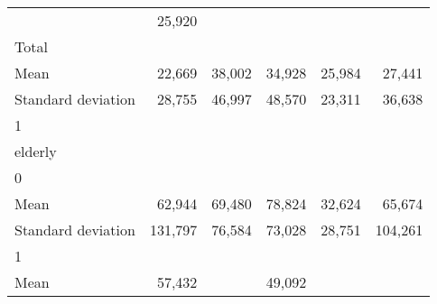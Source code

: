 \begin{tabular}{llllll}
  \multicolumn{1}{r}{} &
  \multicolumn{1}{r}{25,920} \\
\multicolumn{1}{l}{\hspace{3em}Total} &
  \multicolumn{1}{|r}{} &
  \multicolumn{1}{r}{} &
  \multicolumn{1}{r}{} &
  \multicolumn{1}{r}{} &
  \multicolumn{1}{r}{} \\
\multicolumn{1}{l}{\hspace{4em}Mean} &
  \multicolumn{1}{|r}{22,669} &
  \multicolumn{1}{r}{38,002} &
  \multicolumn{1}{r}{34,928} &
  \multicolumn{1}{r}{25,984} &
  \multicolumn{1}{r}{27,441} \\
\multicolumn{1}{l}{\hspace{4em}Standard deviation} &
  \multicolumn{1}{|r}{28,755} &
  \multicolumn{1}{r}{46,997} &
  \multicolumn{1}{r}{48,570} &
  \multicolumn{1}{r}{23,311} &
  \multicolumn{1}{r}{36,638} \\
\multicolumn{1}{l}{\hspace{1em}1} &
  \multicolumn{1}{|r}{} &
  \multicolumn{1}{r}{} &
  \multicolumn{1}{r}{} &
  \multicolumn{1}{r}{} &
  \multicolumn{1}{r}{} \\
\multicolumn{1}{l}{\hspace{2em}elderly} &
  \multicolumn{1}{|r}{} &
  \multicolumn{1}{r}{} &
  \multicolumn{1}{r}{} &
  \multicolumn{1}{r}{} &
  \multicolumn{1}{r}{} \\
\multicolumn{1}{l}{\hspace{3em}0} &
  \multicolumn{1}{|r}{} &
  \multicolumn{1}{r}{} &
  \multicolumn{1}{r}{} &
  \multicolumn{1}{r}{} &
  \multicolumn{1}{r}{} \\
\multicolumn{1}{l}{\hspace{4em}Mean} &
  \multicolumn{1}{|r}{62,944} &
  \multicolumn{1}{r}{69,480} &
  \multicolumn{1}{r}{78,824} &
  \multicolumn{1}{r}{32,624} &
  \multicolumn{1}{r}{65,674} \\
\multicolumn{1}{l}{\hspace{4em}Standard deviation} &
  \multicolumn{1}{|r}{131,797} &
  \multicolumn{1}{r}{76,584} &
  \multicolumn{1}{r}{73,028} &
  \multicolumn{1}{r}{28,751} &
  \multicolumn{1}{r}{104,261} \\
\multicolumn{1}{l}{\hspace{3em}1} &
  \multicolumn{1}{|r}{} &
  \multicolumn{1}{r}{} &
  \multicolumn{1}{r}{} &
  \multicolumn{1}{r}{} &
  \multicolumn{1}{r}{} \\
\multicolumn{1}{l}{\hspace{4em}Mean} &
  \multicolumn{1}{|r}{57,432} &
  \multicolumn{1}{r}{} &
  \multicolumn{1}{r}{49,092} &

\end{tabular}
